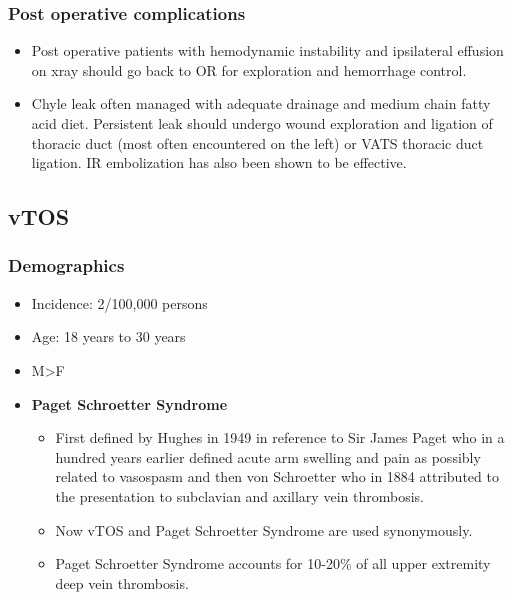 \documentclass[
]{book}
\begin{document}
\citet{siracuseInfraclavicularFirstRib2015}

\hypertarget{post-operative-complications}{%
\subsubsection{Post operative complications}\label{post-operative-complications}}

\begin{itemize}
\item
  Post operative patients with hemodynamic instability and ipsilateral
  effusion on xray should go back to OR for exploration and hemorrhage
  control. \citet{rinehardtCurrentPracticeThoracic2017}
\item
  Chyle leak often managed with adequate drainage and medium chain
  fatty acid diet. Persistent leak should undergo wound exploration
  and ligation of thoracic duct (most often encountered on the left)
  or VATS thoracic duct ligation.\citep{delaney2017} IR embolization has
  also been shown to be effective.\citep{cope1999}
\end{itemize}

\hypertarget{vtos}{%
\subsection{vTOS}\label{vtos}}

\hypertarget{demographics}{%
\subsubsection{Demographics}\label{demographics}}

\begin{itemize}
\item
  Incidence: 2/100,000 persons
\item
  Age: 18 years to 30 years
  \citep{illigComprehensiveReviewPagetSchroetter2010}
\item
  M\textgreater F
\item
  \textbf{Paget Schroetter Syndrome}

  \begin{itemize}
  \item
    First defined by Hughes in 1949 in reference to Sir James Paget
    who in a hundred years earlier defined acute arm swelling and
    pain as possibly related to vasospasm and then von Schroetter
    who in 1884 attributed to the presentation to subclavian and
    axillary vein thrombosis. \citep{humphries123ThoracicOutlet2019}
  \item
    Now vTOS and Paget Schroetter Syndrome are used synonymously.
  \item
    Paget Schroetter Syndrome accounts for 10-20\% of all upper
    extremity deep vein thrombosis.
    \citep{sekharYearbookVascularEndovascular2018}
  \end{itemize}
\end{itemize}
\end{document}
